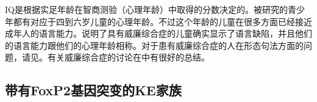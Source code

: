 IQ是根据实足年龄在智商测验（心理年龄）中取得的分数决定的。被研究的青少年都有对应于四到六岁儿童的心理年龄。不过这个年龄的儿童在很多方面已经接近成年人的语言能力。\citet*[]{GSP94a}说明了具有威廉综合症的儿童确实显示了语言缺陷，并且他们的语言能力跟他们的心理年龄相称。对于患有威廉综合症的人在形态句法方面的问题，请见。有关威廉综合症的讨论在中有很好的总结。

\subsection{带有FoxP2基因突变的KE家族}

